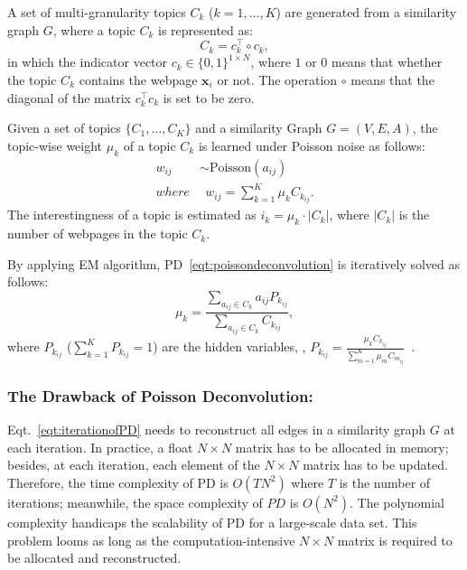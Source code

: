 \documentclass[runningheads]{llncs}
\begin{document}
A set of multi-granularity topics $C_k$ ($k=1,\ldots,K$) are generated from a similarity graph $G$, where a topic $C_k$ is represented as:
\begin{equation}\label{eqt:ck}
C_{k} = c^{\top}_k{\circ} c_k,
\end{equation}
in which the indicator vector $ c_k \in \{0, 1\}^{1\times N}$, where $1$ or $0$ means that whether the topic $C_k$ contains the webpage $\mathbf{x}_i$ or not. The operation $\circ$ means that the diagonal of the matrix $c^{\top}_k c_k$ is set to be zero.

Given a set of topics $\{C_1,\ldots, C_K\}$ and a similarity Graph \mbox{$G=(V,E,A)$}, the topic-wise weight $\mu_k$ of a topic $C_k$ is learned under Poisson noise as follows:
\begin{equation} \label{eqt:poissondeconvolution}
\begin{split}
w_{ij} & \sim \text{Poisson}(a_{ij})\\
where & \ \ w_{ij} = \sum_{k=1}^{K} \mu_k C_{k_{ij}}.
\end{split}
\end{equation}
The interestingness of a topic is estimated as $i_k=\mu_k\cdot |C_k|$, where $|C_k|$ is the number of webpages in the topic $C_k$.

By applying EM algorithm, PD~\eqref{eqt:poissondeconvolution} is iteratively solved as follows:
\begin{equation} \label{eqt:iterationofPD}
    \mu_k = \frac{\sum_{a_{ij}\in C_k} a_{ij} P_{k_{ij}}}{\sum_{a_{ij}\in C_k} C_{k_{ij}}},
\end{equation}
where $P_{k_{ij}}$ ($\sum_{k=1}^{K} P_{k_{ij}}=1$) are the hidden variables, , $P_{k_{ij}} = \frac{\mu_k C_{k_{ij}}}{\sum_{m=1}^{K}\mu_m C_{m_{ij}}}$~\cite{pang-2013-unsupervised}.

\subsubsection{The Drawback of Poisson Deconvolution:}
Eqt.~\eqref{eqt:iterationofPD} needs to reconstruct all edges in a similarity graph $G$ at each iteration. In practice, a float $N\times N$ matrix has to be allocated in memory; besides, at each iteration, each element of the $N\times N$ matrix has to be updated. Therefore, the time complexity of PD is $O(TN^2)$ where $T$ is the number of iterations; meanwhile, the space complexity of $PD$ is $O(N^2)$. The polynomial complexity handicaps the scalability of PD for a large-scale data set. This problem looms as long as the computation-intensive $N\times N$ matrix is required to be allocated and reconstructed.
\end{document}
